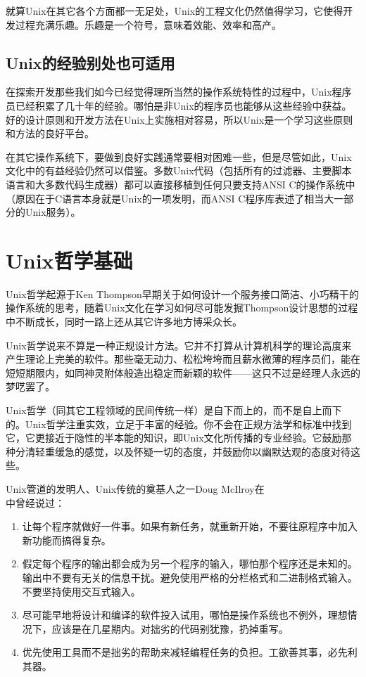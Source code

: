 \documentclass[12pt,oneside]{book}
\begin{document}
\begin{common-format}
就算Unix在其它各个方面都一无足处，Unix的工程文化仍然值得学习，它使得开发过程充满乐趣。乐趣是一个符号，意味着效能、效率和高产。

\subsection{Unix的经验别处也可适用}
在探索开发那些我们如今已经觉得理所当然的操作系统特性的过程中，Unix程序员已经积累了几十年的经验。哪怕是非Unix的程序员也能够从这些经验中获益。好的设计原则和开发方法在Unix上实施相对容易，所以Unix是一个学习这些原则和方法的良好平台。

在其它操作系统下，要做到良好实践通常要相对困难一些，但是尽管如此，Unix文化中的有益经验仍然可以借鉴。多数Unix代码（包括所有的过滤器、主要脚本语言和大多数代码生成器）都可以直接移植到任何只要支持ANSI C的操作系统中（原因在于C语言本身就是Unix的一项发明，而ANSI C程序库表述了相当大一部分的Unix服务）。


\section{Unix哲学基础}
Unix哲学起源于Ken Thompson早期关于如何设计一个服务接口简洁、小巧精干的操作系统的思考，随着Unix文化在学习如何尽可能发掘Thompson设计思想的过程中不断成长，同时一路上还从其它许多地方博采众长。

Unix哲学说来不算是一种正规设计方法。它并不打算从计算机科学的理论高度来产生理论上完美的软件。那些毫无动力、松松垮垮而且薪水微薄的程序员们，能在短短期限内，如同神灵附体般造出稳定而新颖的软件——这只不过是经理人永远的梦呓罢了。
    
Unix哲学（同其它工程领域的民间传统一样）是自下而上的，而不是自上而下的。Unix哲学注重实效，立足于丰富的经验。你不会在正规方法学和标准中找到它，它更接近于隐性的半本能的知识，即Unix文化所传播的专业经验。它鼓励那种分清轻重缓急的感觉，以及怀疑一切的态度，并鼓励你以幽默达观的态度对待这些。
   
Unix管道的发明人、Unix传统的奠基人之一Doug McIlroy在\\ \cite{McIlroy78}中曾经说过：
\begin{enumerate}
\renewcommand{\labelenumi}{（\roman{enumi}）}
\item 让每个程序就做好一件事。如果有新任务，就重新开始，不要往原程序中加入新功能而搞得复杂。
\item 假定每个程序的输出都会成为另一个程序的输入，哪怕那个程序还是未知的。输出中不要有无关的信息干扰。避免使用严格的分栏格式和二进制格式输入。不要坚持使用交互式输入。
\item 尽可能早地将设计和编译的软件投入试用，哪怕是操作系统也不例外，理想情况下，应该是在几星期内。对拙劣的代码别犹豫，扔掉重写。
\item 优先使用工具而不是拙劣的帮助来减轻编程任务的负担。工欲善其事，必先利其器。
\end{enumerate}


\end{common-format}
\end{document}
